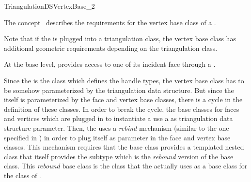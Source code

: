 

\begin{ccRefConcept}{TriangulationDSVertexBase_2}


\ccDefinition
  
The concept \ccRefName\ describes the requirements for the
vertex base class of a .

Note that if  the  
is plugged  into a triangulation class, 
the vertex base class has additional geometric
requirements depending on the triangulation class.

At the base level,  
provides access to one of its incident
face through a .

Since the  is the class 
which defines the handle
types, the vertex base class has to be somehow 
parameterized by the triangulation
data structure.  But since the 
itself is parameterized by the face and vertex
base classes, there is a cycle in the definition of these classes.  
In order
to break the cycle, the base classes for faces and vertices
 which are plugged in to instantiate a
use a  as triangulation
data structure parameter. Then,
the 
uses a {\it rebind}  mechanism (similar to the one specified in
) in order to plug itself 
as parameter in the face and vertex  base classes. 
This mechanism requires that the base class  provides
a templated nested class  that
itself provides 
the subtype 
which is the {\it rebound} version of the base class.
 This {\it rebound} base class is  the class
that the   
 actually  uses  as a base class for the class
of .




\end{ccRefConcept}
